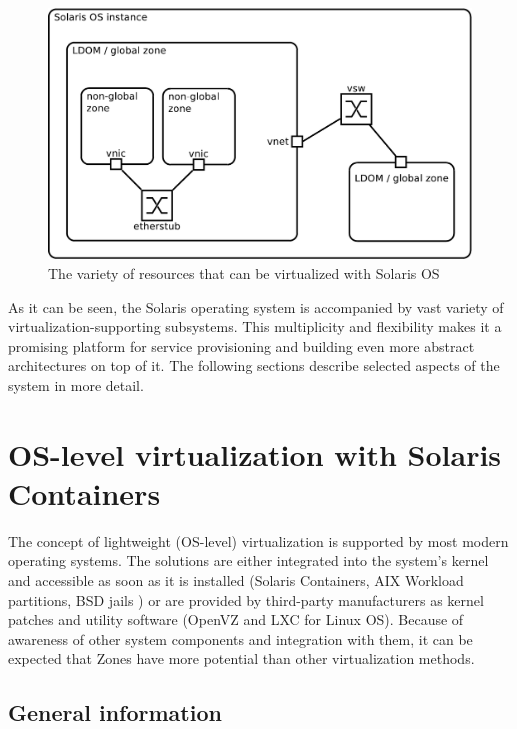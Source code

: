 \documentclass[11pt]{book}
\begin{document}
      \begin{figure}[H]
        \begin{center}
          \includegraphics[width=.7\textwidth]{img/solaris/full-featured.pdf}
        \end{center}

        \caption{The variety of resources that can be virtualized with Solaris OS}
      \end{figure}

      As it can be seen, the Solaris operating system is accompanied by vast variety of virtualization-supporting
      subsystems. This multiplicity and flexibility makes it a promising platform for service provisioning and building
      even more abstract architectures on top of it. The following sections describe selected aspects of the system in
      more detail.


    \section{OS-level virtualization with Solaris Containers}
    \label{sec:sol:containers}


      The concept of lightweight (OS-level) virtualization is supported by most modern operating systems. The solutions
      are either integrated into the system's kernel and accessible as soon as it is installed (Solaris Containers, AIX
      Workload partitions, BSD jails \cite{kamp}) or are provided by third-party manufacturers as kernel patches and
      utility software (OpenVZ and LXC for Linux OS). Because of awareness of other system components and integration 
      with them, it can be expected that Zones have more potential than other virtualization methods.


      \subsection{General information}
      \label{sub:}
\end{document}
